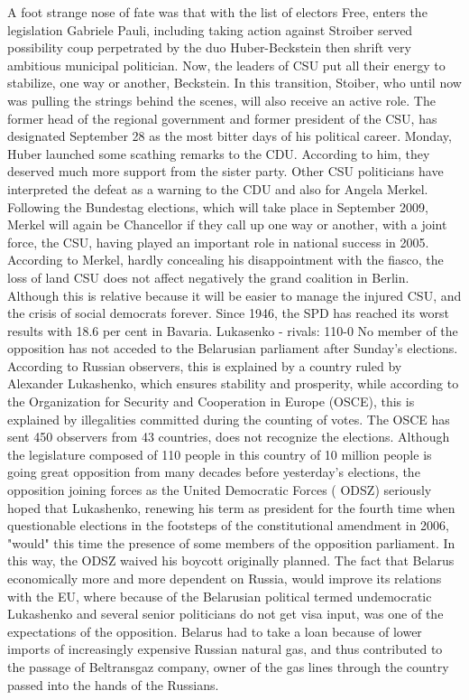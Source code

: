 A foot strange nose of fate was that with the list of electors Free, enters the legislation Gabriele Pauli, including taking action against Stroiber served possibility coup perpetrated by the duo Huber-Beckstein then shrift very ambitious municipal politician.
Now, the leaders of CSU put all their energy to stabilize, one way or another, Beckstein.
In this transition, Stoiber, who until now was pulling the strings behind the scenes, will also receive an active role. The former head of the regional government and former president of the CSU, has designated September 28 as the most bitter days of his political career.
Monday, Huber launched some scathing remarks to the CDU. According to him, they deserved much more support from the sister party.
Other CSU politicians have interpreted the defeat as a warning to the CDU and also for Angela Merkel.
Following the Bundestag elections, which will take place in September 2009, Merkel will again be Chancellor if they call up one way or another, with a joint force, the CSU, having played an important role in national success in 2005.
According to Merkel, hardly concealing his disappointment with the fiasco, the loss of land CSU does not affect negatively the grand coalition in Berlin.
Although this is relative because it will be easier to manage the injured CSU, and the crisis of social democrats forever.
Since 1946, the SPD has reached its worst results with 18.6 per cent in Bavaria.
Lukasenko - rivals: 110-0
No member of the opposition has not acceded to the Belarusian parliament after Sunday's elections.
According to Russian observers, this is explained by a country ruled by Alexander Lukashenko, which ensures stability and prosperity, while according to the Organization for Security and Cooperation in Europe (OSCE), this is explained by illegalities committed during the counting of votes.
The OSCE has sent 450 observers from 43 countries, does not recognize the elections.
Although the legislature composed of 110 people in this country of 10 million people is going great opposition from many decades before yesterday's elections, the opposition joining forces as the United Democratic Forces ( ODSZ) seriously hoped that Lukashenko, renewing his term as president for the fourth time when questionable elections in the footsteps of the constitutional amendment in 2006, "would" this time the presence of some members of the opposition parliament.
In this way, the ODSZ waived his boycott originally planned.
The fact that Belarus economically more and more dependent on Russia, would improve its relations with the EU, where because of the Belarusian political termed undemocratic Lukashenko and several senior politicians do not get visa input, was one of the expectations of the opposition. Belarus had to take a loan because of lower imports of increasingly expensive Russian natural gas, and thus contributed to the passage of Beltransgaz company, owner of the gas lines through the country passed into the hands of the Russians.
